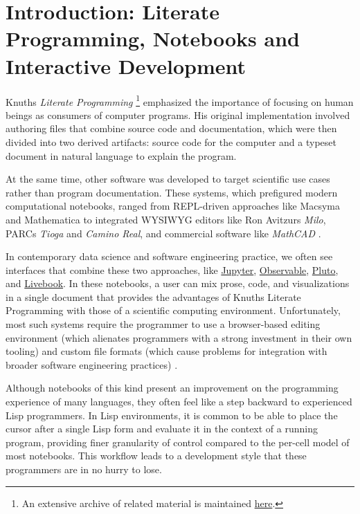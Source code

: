 \documentclass[sigconf,screen]{acmart}
\begin{document}
\hypertarget{introduction:-literate-programmingux2c-notebooks-and-interactive-development}{%
\section{Introduction: Literate Programming, Notebooks and Interactive Development}\label{introduction:-literate-programmingux2c-notebooks-and-interactive-development}}

Knuth\textquotesingle s \emph{Literate Programming} \footnote{An extensive archive of related material is maintained \href{http://www.literateprogramming.com}{here}.} emphasized the importance of focusing on human beings as consumers of computer programs. His original implementation involved authoring files that combine source code and documentation, which were then divided into two derived artifacts: source code for the computer and a typeset document in natural language to explain the program.

At the same time, other software was developed to target scientific use cases rather than program documentation. These systems, which prefigured modern computational notebooks, ranged from REPL-driven approaches like Macsyma and Mathematica to integrated WYSIWYG editors like Ron Avitzur\textquotesingle s \emph{Milo}, PARC\textquotesingle s \emph{Tioga} and \emph{Camino Real}, and commercial software like \emph{MathCAD} \cite{Kajler_1998}.

In contemporary data science and software engineering practice, we often see interfaces that combine these two approaches, like \href{https://jupyter.org}{Jupyter}, \href{https://observablehq.com}{Observable}, \href{https://plutojl.org}{Pluto}, and \href{https://livebook.dev}{Livebook}. In these notebooks, a user can mix prose, code, and visualizations in a single document that provides the advantages of Knuth\textquotesingle s Literate Programming with those of a scientific computing environment. Unfortunately, most such systems require the programmer to use a browser-based editing environment (which alienates programmers with a strong investment in their own tooling) and custom file formats (which cause problems for integration with broader software engineering practices) \cite{Chattopadhyay_2020}.

Although notebooks of this kind present an improvement on the programming experience of many languages, they often feel like a step backward to experienced Lisp programmers. In Lisp environments, it is common to be able to place the cursor after a single Lisp form and evaluate it in the context of a running program, providing finer granularity of control compared to the per-cell model of most notebooks. This workflow leads to a development style that these programmers are in no hurry to lose.
\end{document}
